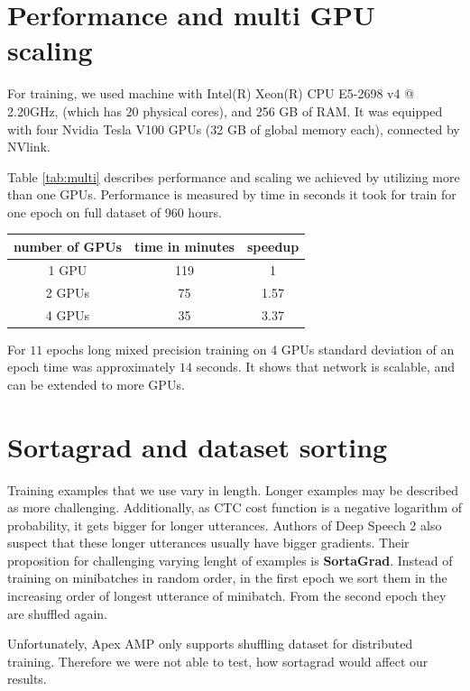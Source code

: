\documentclass[licencjacka,en]{pracamgr}
\begin{document}
	
	\section{Performance and multi GPU scaling}
	For training, we used machine with Intel(R) Xeon(R) CPU E5-2698 v4 @ 2.20GHz, (which has 20 physical cores), and 256 GB of RAM. It was equipped with four Nvidia Tesla V100 GPUs (32 GB of global memory each), connected by NVlink.
	
	Table \ref{tab:multi} describes performance and scaling we achieved by utilizing more than one GPUs. Performance is measured by time in seconds it took for train for one epoch on full dataset of 960 hours.
	
	{
		\centering
		\begin{tabular}{|c|c|c|}
			\hline
			number of GPUs & time in minutes & speedup \\
			\hline
			1 GPU & 119 & 1 \\
			\hline
			2 GPUs & 75 & 1.57 \\
			\hline
			4 GPUs & 35 & 3.37 \\
			\hline
		\end{tabular}
		\label{tab:multi}
	}
	
	For $11$ epochs long mixed precision training on 4 GPUs standard deviation of an epoch time was approximately $14$ seconds. It shows that network is scalable, and can be extended to more GPUs.
	
	
	\section{Sortagrad and dataset sorting}
	Training examples that we use vary in length. Longer examples may be described as more challenging. Additionally, as CTC cost function is a negative logarithm of probability, it gets bigger for longer utterances. Authors of Deep Speech 2 also suspect that these longer utterances usually have bigger gradients. Their proposition for challenging varying lenght of examples is \textbf{SortaGrad}. Instead of training on minibatches in random order, in the first epoch we sort them in the increasing order of longest utterance of minibatch. From the second epoch they are shuffled again.
	
	Unfortunately, Apex AMP only supports shuffling dataset for distributed training. Therefore we were not able to test, how sortagrad would affect our results.
	
\end{document}
